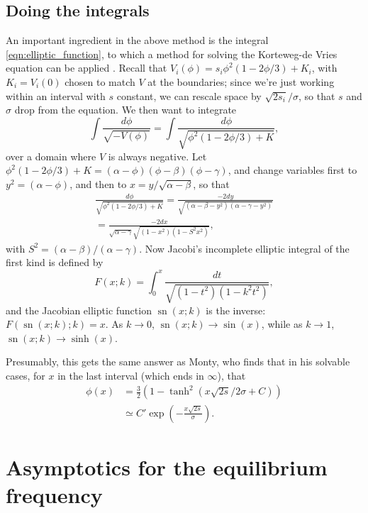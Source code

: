 \documentclass{article}
\DeclareMathOperator{\sn}{sn}
\begin{document}
\subsection{Doing the integrals}

An important ingredient in the above method is the integral \eqref{eqn:elliptic_function},
to which a method for solving the Korteweg-de Vries equation can be applied \citep{NEQwiki}.
Recall that $V_i(\phi) =  s_i \phi^2(1-2\phi/3) + K_i$, with $K_i = V_i(0)$ chosen to match $V$ at the boundaries;
since we're just working within an interval with $s$ constant, we can rescale space by $\sqrt{2 s_i}/\sigma$,
so that $s$ and $\sigma$ drop from the equation.
We then want to integrate
\[
    \int \frac{ d\phi }{ \sqrt{-V(\phi)} } = 
         \int \frac{ d\phi }{ \sqrt{ \phi^2 (1-2\phi/3) + K } } ,
\]
over a domain where $V$ is always negative.
Let $\phi^2(1-2\phi/3)+K = (\alpha-\phi)(\phi-\beta)(\phi-\gamma)$,
and change variables first to $y^2=(\alpha-\phi)$, 
and then to $x = y/\sqrt{\alpha-\beta}$, so that
\begin{align*}
    \frac{ d\phi }{ \sqrt{ \phi^2 (1-2\phi/3) + K } } 
        = \frac{ - 2 dy }{ \sqrt{ (\alpha-\beta-y^2) (\alpha-\gamma-y^2) } } \\
        = \frac{ - 2 dx }{ \sqrt{\alpha-\gamma} \sqrt{ (1-x^2) (1-S^2 x^2) } } ,
\end{align*}
with $S^2 = (\alpha-\beta)/(\alpha-\gamma)$.
Now Jacobi's incomplete elliptic integral of the first kind is defined by
\[
    F(x;k) = \int_0^x \frac{dt}{\sqrt{ (1-t^2)(1-k^2t^2) }} ,
\]
and the Jacobian elliptic function $\sn(x;k)$ is the inverse: $F(\sn(x;k);k) = x$.
As $k \to 0$, $\sn(x;k) \to \sin(x)$, while as $k \to 1$, $\sn(x;k) \to \sinh(x)$.

Presumably, this gets the same answer as Monty, who finds that in his solvable cases,
for $x$ in the last interval (which ends in $\infty$), that
\begin{align*}
    \phi(x) &= \frac{3}{2}\left( 1 - \tanh^2 ( x \sqrt{2s} / 2 \sigma + C ) \right) \\
        &\simeq C' \exp\left( - \frac{ x \sqrt{2s} }{ \sigma } \right) .
\end{align*}



\section{Asymptotics for the equilibrium frequency}
\label{apx:asymptotic_freq}
\end{document}
